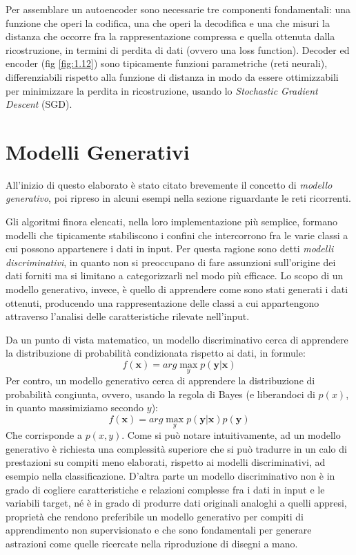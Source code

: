 Per assemblare un autoencoder sono necessarie tre componenti fondamentali: una funzione che operi la codifica, una che operi la decodifica e una che misuri la distanza che occorre fra la rappresentazione compressa e quella ottenuta dalla ricostruzione, in termini di perdita di dati (ovvero una loss function).
Decoder ed encoder (fig \ref{fig:1.12}) sono tipicamente funzioni parametriche (reti neurali), differenziabili rispetto alla funzione di distanza in modo da essere ottimizzabili per minimizzare la perdita in ricostruzione, usando lo \textit{Stochastic Gradient Descent} (SGD).
\section{Modelli Generativi} %
\label{sec:modelli_generativi}
All'inizio di questo elaborato è stato citato brevemente il concetto di \textit{modello generativo}, poi ripreso in alcuni esempi nella sezione riguardante le reti ricorrenti.

Gli algoritmi finora elencati, nella loro implementazione più semplice, formano modelli che tipicamente stabiliscono i confini che intercorrono fra le varie classi a cui possono appartenere i dati in input. Per questa ragione sono detti \textit{modelli discriminativi}, in quanto non si preoccupano di fare assunzioni sull'origine dei dati forniti ma si limitano a categorizzarli nel modo più efficace. Lo scopo di un modello generativo, invece, è quello di apprendere come sono stati generati i dati ottenuti, producendo una rappresentazione delle classi a cui appartengono attraverso l'analisi delle caratteristiche rilevate nell'input.

Da un punto di vista matematico, un modello discriminativo cerca di apprendere la distribuzione di probabilità condizionata rispetto ai dati, in formule: 
\begin{equation}
	\label{conditional}
	f(\boldsymbol{x}) = arg \max_y p(\boldsymbol{y}|\boldsymbol{x})
\end{equation}
Per contro, un modello generativo cerca di apprendere la distribuzione di probabilità congiunta, ovvero, usando la regola di Bayes (e liberandoci di $p(x)$, in quanto massimiziamo secondo $y$):
\begin{equation}
	\label{joint}
	f(\boldsymbol{x}) = arg\max_y p(\boldsymbol{y}|\boldsymbol{x})p(\boldsymbol{y})
\end{equation}
Che corrisponde a $p(x, y)$. Come si può notare intuitivamente, ad un modello generativo è richiesta una complessità superiore che si può tradurre in un calo di prestazioni su compiti meno elaborati, rispetto ai modelli discriminativi, ad esempio nella classificazione. D'altra parte un modello discriminativo non è in grado di cogliere caratteristiche e relazioni complesse fra i dati in input e le variabili target, né è in grado di produrre dati originali analoghi a quelli appresi, proprietà che rendono preferibile un modello generativo per compiti di apprendimento non supervisionato e che sono fondamentali per generare astrazioni come quelle ricercate nella riproduzione di disegni a mano.
